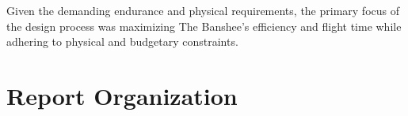 Given the demanding endurance and physical requirements, the primary focus of the design process was maximizing The Banshee’s efficiency and flight time while adhering to physical and budgetary constraints.



\section{Report Organization}

